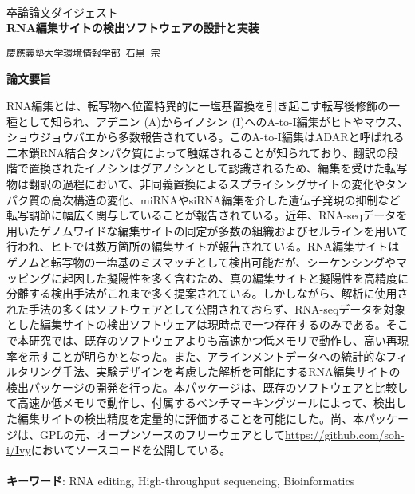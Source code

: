 　\\
卒論論文ダイジェスト\\
\vspace{1cm}
{\Large
\textbf{RNA編集サイトの検出ソフトウェアの設計と実装}
}
\begin{flushright}
	\texttt{慶應義塾大学環境情報学部 石黒 宗}
\end{flushright}

\begin{center}
	\textbf{論文要旨}

\end{center}
RNA編集とは、転写物へ位置特異的に一塩基置換を引き起こす転写後修飾の一種として知られ、アデニン (A)からイノシン (I)へのA-to-I編集がヒトやマウス、ショウジョウバエから多数報告されている。このA-to-I編集はADARと呼ばれる二本鎖RNA結合タンパク質によって触媒されることが知られており、翻訳の段階で置換されたイノシンはグアノシンとして認識されるため、編集を受けた転写物は翻訳の過程において、非同義置換によるスプライシングサイトの変化やタンパク質の高次構造の変化、miRNAやsiRNA編集を介した遺伝子発現の抑制など転写調節に幅広く関与していることが報告されている。近年、RNA-seqデータを用いたゲノムワイドな編集サイトの同定が多数の組織およびセルラインを用いて行われ、ヒトでは数万箇所の編集サイトが報告されている。RNA編集サイトはゲノムと転写物の一塩基のミスマッチとして検出可能だが、シーケンシングやマッピングに起因した擬陽性を多く含むため、真の編集サイトと擬陽性を高精度に分離する検出手法がこれまで多く提案されている。しかしながら、解析に使用された手法の多くはソフトウェアとして公開されておらず、RNA-seqデータを対象とした編集サイトの検出ソフトウェアは現時点で一つ存在するのみである。そこで本研究では、既存のソフトウェアよりも高速かつ低メモリで動作し、高い再現率を示すことが明らかとなった。また、アラインメントデータへの統計的なフィルタリング手法、実験デザインを考慮した解析を可能にするRNA編集サイトの検出パッケージの開発を行った。本パッケージは、既存のソフトウェアと比較して高速か低メモリで動作し、付属するベンチマーキングツールによって、検出した編集サイトの検出精度を定量的に評価することを可能にした。尚、本パッケージは、GPLの元、オープンソースのフリーウェアとして\url{https://github.com/soh-i/Ivy}においてソースコードを公開している。
\\
\\
\textbf{キーワード}: RNA editing, High-throughput sequencing, Bioinformatics

\newpage

\setcounter{chapter}{1}
